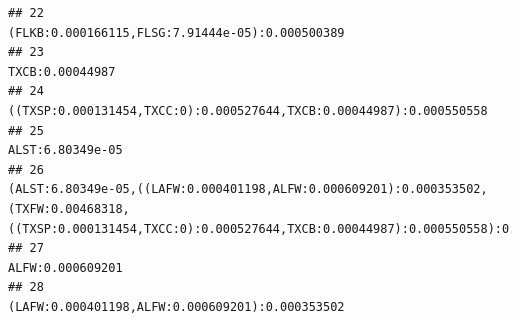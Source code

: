 \documentclass[]{article}
\begin{document}
\begin{verbatim}
## 22                                                                                                                                                                                                                                                                                                                                                                                  (FLKB:0.000166115,FLSG:7.91444e-05):0.000500389
## 23                                                                                                                                                                                                                                                                                                                                                                                                                  TXCB:0.00044987
## 24                                                                                                                                                                                                                                                                                                                                                              ((TXSP:0.000131454,TXCC:0):0.000527644,TXCB:0.00044987):0.000550558
## 25                                                                                                                                                                                                                                                                                                                                                                                                                 ALST:6.80349e-05
## 26                                                                                                                                                                                                                                      (ALST:6.80349e-05,((LAFW:0.000401198,ALFW:0.000609201):0.000353502,(TXFW:0.00468318,((TXSP:0.000131454,TXCC:0):0.000527644,TXCB:0.00044987):0.000550558):0.00263375):0.000535248):0.0026018
## 27                                                                                                                                                                                                                                                                                                                                                                                                                 ALFW:0.000609201
## 28                                                                                                                                                                                                                                                                                                                                                                                  (LAFW:0.000401198,ALFW:0.000609201):0.000353502

\end{verbatim}
\end{document}
